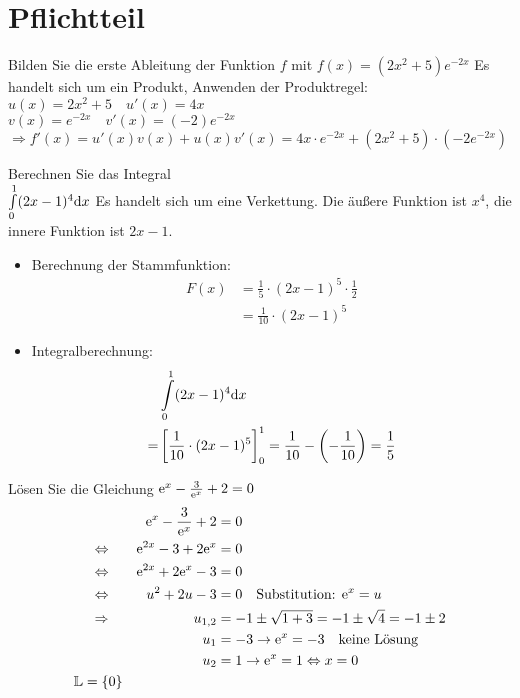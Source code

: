 



\section{Pflichtteil}
 Bilden Sie die erste Ableitung der Funktion $f$ mit $f(x) = (2x^2+5)e^{-2x}$
\loesung{}
Es handelt sich um ein Produkt, Anwenden der Produktregel:\\
$u(x) = 2x^2+5 \quad u'(x)=4x$\\
$v(x) = e^{-2x} \quad v'(x)=(-2)e^{-2x}$\\
$\Rightarrow f'(x)=u'(x)v(x)+u(x)v'(x) = 4x\cdot e^{-2x}+(2x^2+5)\cdot(-2e^{-2x})$

 Berechnen Sie das Integral\\
$\int\limits_0^1(2x-1)^4 \mathrm{d} x$
\loesung{}
Es handelt sich um eine Verkettung.
Die äußere Funktion ist $x^4$, die innere Funktion ist $2x-1$.\\
\begin{itemize}
  \item  Berechnung der Stammfunktion:
  \begin{align*}
    F(x) &= \frac 1 5 \cdot(2x-1)^5\cdot\frac 1 2\\
    &=\frac{1}{10}\cdot(2x-1)^5
  \end{align*}
  \item Integralberechnung:
  \begin{align*}
    &\int\limits_0^1(2x-1)^4 \mathrm{d} x\\
    =&\left[\frac{1}{10}\cdot(2x-1)^5\right]^1_0 = \frac{1}{10}-\left(-\frac{1}{10}\right) = \frac 1 5
  \end{align*}
\end{itemize}

Lösen Sie die Gleichung $\mathrm{e}^x-\frac{3}{\mathrm{e}^x}+2=0$\\
\loesung{}
\begin{alignat*}{2}
    &&\mathrm{e}^x-\frac{3}{\mathrm{e}^x}+2 &= 0\\
    \Leftrightarrow\quad && \mathrm{e}^{2x}-3+2\mathrm{e}^x &= 0\\
    \Leftrightarrow\quad && \mathrm{e}^{2x}+2\mathrm{e}^x-3 &= 0\\
    \Leftrightarrow\quad && u^2+2u-3 &= 0 \quad\text{Substitution: }\mathrm{e}^x=u\\
    \Rightarrow\quad && u_{1,2} &= -1\pm\sqrt{1+3}=-1\pm\sqrt{4}=-1\pm2\\
    && u_1 &= -3 \rightarrow \mathrm{e}^x = -3 \quad\text{keine Lösung}\\
    && u_2 &= 1 \rightarrow \mathrm{e}^x = 1 \Leftrightarrow x=0\\
    \mathbb{L} = \{0\}
\end{alignat*}

